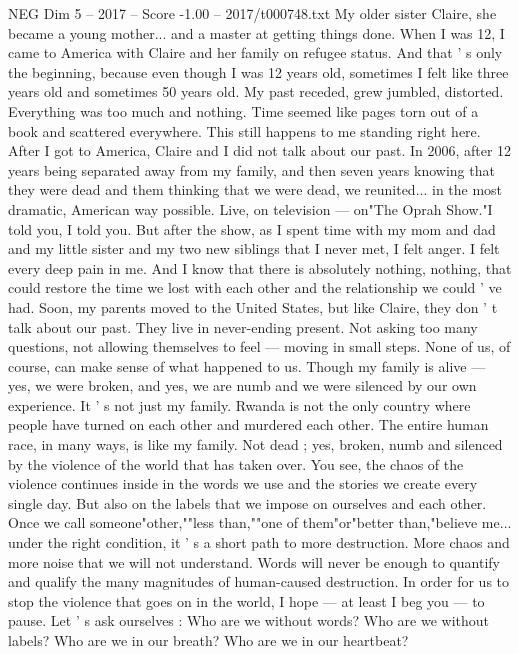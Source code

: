 \begin{textsample}{NEG Dim 5 – 2017 – Score -1.00 – 2017/t000748.txt}
My older sister Claire, she became a young mother... and a master at getting things done.
When I was 12, I came to America with Claire and her family on refugee status.
And that ' s only the beginning, because even though I was 12 years old, sometimes I felt like three years old and sometimes 50 years old.
My past receded, grew jumbled, distorted.
Everything was too much and nothing.
Time seemed like pages torn out of a book and scattered everywhere.
This still happens to me standing right here.
After I got to America, Claire and I did not talk about our past.
In 2006, after 12 years being separated away from my family, and then seven years knowing that they were dead and them thinking that we were dead, we reunited... in the most dramatic, American way possible.
Live, on television — on"The Oprah Show."I told you, I told you.
But after the show, as I spent time with my mom and dad and my little sister and my two new siblings that I never met, I felt anger.
I felt every deep pain in me.
And I know that there is absolutely nothing, nothing, that could restore the time we lost with each other and the relationship we could ' ve had.
Soon, my parents moved to the United States, but like Claire, they don ' t talk about our past.
They live in never-ending present.
Not asking too many questions, not allowing themselves to feel — moving in small steps.
None of us, of course, can make sense of what happened to us.
Though my family is alive — yes, we were broken, and yes, we are numb and we were silenced by our own experience.
It ' s not just my family.
Rwanda is not the only country where people have turned on each other and murdered each other.
The entire human race, in many ways, is like my family.
Not dead ; yes, broken, numb and silenced by the violence of the world that has taken over.
You see, the chaos of the violence continues inside in the words we use and the stories we create every single day.
But also on the labels that we impose on ourselves and each other.
Once we call someone"other,""less than,""one of them"or"better than,"believe me... under the right condition, it ' s a short path to more destruction.
More chaos and more noise that we will not understand.
Words will never be enough to quantify and qualify the many magnitudes of human-caused destruction.
In order for us to stop the violence that goes on in the world, I hope — at least I beg you — to pause.
Let ' s ask ourselves : Who are we without words?
Who are we without labels?
Who are we in our breath?
Who are we in our heartbeat?

\end{textsample}
